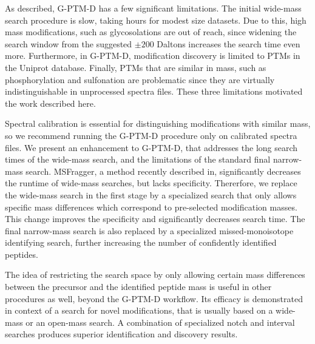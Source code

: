 \documentclass[journal=jprobs,manuscript=article]{achemso}
\begin{document}
As described, G-PTM-D has a few significant limitations.
The initial wide-mass search procedure is slow, taking hours for modest size datasets.
Due to this, high mass modifications, such as glycosolations are out of reach, since widening the search window from the suggested $\pm 200$ Daltons increases the search time even more.
Furthermore, in G-PTM-D, modification discovery is limited to PTMs in the Uniprot database. 
Finally, PTMs that are similar in mass, such as phosphorylation and sulfonation are problematic since they are virtually indistinguishable in unprocessed spectra files.
These three limitations motivated the work described here.

Spectral calibration is essential for distinguishing modifications with similar mass, so we recommend running the G-PTM-D procedure only on calibrated spectra files.
We present an enhancement to G-PTM-D, that addresses the long search times of the wide-mass search, and the limitations of the standard final narrow-mass search.
MSFragger, a method recently described in\cite{Kong_2017}, significantly decreases the runtime of wide-mass searches, but lacks specificity.
Thererfore, we replace the wide-mass search in the first stage by a specialized search that only allows specific mass differences which correspond to pre-selected modification masses.
This change improves the specificity and significantly decreases search time.
The final narrow-mass search is also replaced by a specialized missed-monoisotope identifying search, further increasing the number of confidently identified peptides. 

The idea of restricting the search space by only allowing certain mass differences between the precursor and the identified peptide mass is useful in other procedures as well, beyond the G-PTM-D workflow.
Its efficacy is demonstrated in context of a search for novel modifications, that is usually based on a wide-mass or an open-mass search.
A combination of specialized notch and interval searches produces superior identification and discovery results.
\end{document}
